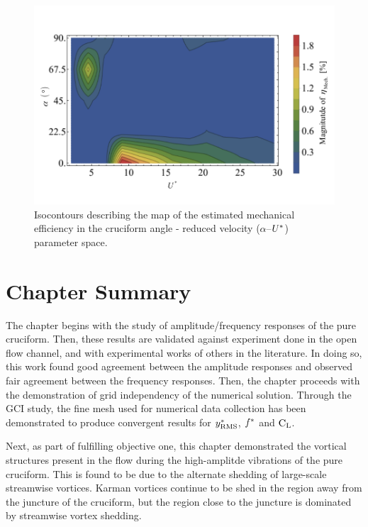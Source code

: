 \documentclass[oneside]{utmthesis}
\begin{document}
\begin{figure}[H]
  \centering
  \includegraphics[width=1\textwidth]{figs/powerEfficiencyContours}
  \caption{Isocontours describing the map of the estimated mechanical efficiency in the cruciform angle - reduced velocity ($\alpha$--$U^{*}$) parameter space.}
  \label{fig:powerEfficiencyContour}
\end{figure}

\section{Chapter Summary} \label{ssec:chapSumResults}
The chapter begins with the study of amplitude/frequency responses of the pure cruciform. Then, these results are validated against  experiment done in the open flow channel, and with experimental works of others in the literature. In doing so, this work found good agreement between the amplitude responses and observed fair agreement between the frequency responses. Then, the chapter proceeds with the demonstration of grid independency of the numerical solution. Through the GCI study, the fine mesh used for numerical data collection has been demonstrated to produce convergent results for $y^{*}_{\text{RMS}}$, $f^{*}$ and $\text{C}_{\text{L}}$.

Next, as part of fulfilling objective one, this chapter demonstrated the vortical structures present in the flow during the high-amplitde vibrations of the pure cruciform. This is found to be due to the alternate shedding of large-scale streamwise vortices. Karman vortices continue to be shed in the region away from the juncture of the cruciform, but the region close to the juncture is dominated by streamwise vortex shedding.
\end{document}
